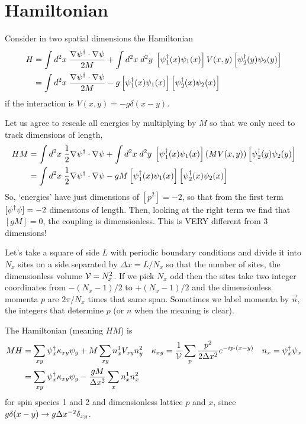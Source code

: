 \section{Hamiltonian}\label{sec:hamiltonian}

Consider in two spatial dimensions the Hamiltonian
\begin{align}
	H
	&= \int d^2x\; \frac{\nabla \psi{}^{\dagger} \cdot \nabla \psi}{2M} + \int d^2x\; d^2y\; \left[\psi{}^{\dagger}_1(x) \psi_1(x)\right] V(x,y) \left[\psi{}^{\dagger}_2(y) \psi_2(y)\right]
	\\
	&= \int d^2x\; \frac{\nabla \psi{}^{\dagger} \cdot \nabla \psi}{2M} - g \left[\psi{}^{\dagger}_1(x) \psi_1(x)\right] \left[\psi{}^{\dagger}_2(x) \psi_2(x)\right]
\end{align}
if the interaction is $V(x,y) = -g \delta(x-y)$.

Let us agree to rescale all energies by multiplying by $M$ so that we only need to track dimensions of length,
\begin{align}
	HM
	&= \int d^2x\; \frac{1}{2} \nabla \psi{}^{\dagger} \cdot \nabla \psi + \int d^2x\; d^2y\; \left[\psi{}^{\dagger}_1(x) \psi_1(x)\right] (MV(x,y)) \left[\psi{}^{\dagger}_2(y) \psi_2(y)\right]
	\\
	&= \int d^2x\; \frac{1}{2} \nabla \psi{}^{\dagger} \cdot \nabla \psi - gM \left[\psi{}^{\dagger}_1(x) \psi_1(x)\right] \left[\psi{}^{\dagger}_2(x) \psi_2(x)\right]
\end{align}
So, `energies' have just dimensions of $[p^2] = -2$, so that from the first term $[\psi{}^{\dagger}\psi] = -2$ dimensions of length.
Then, looking at the right term we find that $[gM] = 0$, the coupling is dimensionless.
This is VERY different from 3 dimensions!

Let's take a square of side $L$ with periodic boundary conditions and divide it into $N_x$ sites on a side separated by $\Delta x = L/N_x$ so that the number of sites, the dimensionless volume $\mathcal{V}=N_x^2$.
If we pick $N_x$ odd then the sites take two integer coordinates from $-(N_x-1)/2$ to $+(N_x-1)/2$ and the dimensionless momenta $p$ are $2\pi / N_x$ times that same span.
Sometimes we label momenta by $\vec{n}$, the integers that determine $p$ (or $n$ when the meaning is clear).

The Hamiltonian (meaning $HM$) is
\begin{align}
	MH &= \sum_{xy} \psi{}^{\dagger}_x \kappa_{xy} \psi_y + M \sum_{xy} n^1_x V_{xy} n^2_y
	&
    \kappa_{xy} &= \frac{1}{\mathcal{V}} \sum_{p} \frac{p^2}{2\Delta x^2} e^{-i p \cdot (x-y)}
	&
	n_x &= \psi{}^{\dagger}_x \psi_x
	\\
	&= \sum_{xy} \psi{}^{\dagger}_x \kappa_{xy} \psi_y - \frac{gM}{\Delta x^2} \sum_{x} n^1_x n^2_x
\end{align}
for spin species 1 and 2 and dimensionless lattice $p$ and $x$, since $g\delta(x-y) \rightarrow g \Delta x^{-2} \delta_{xy}$.

